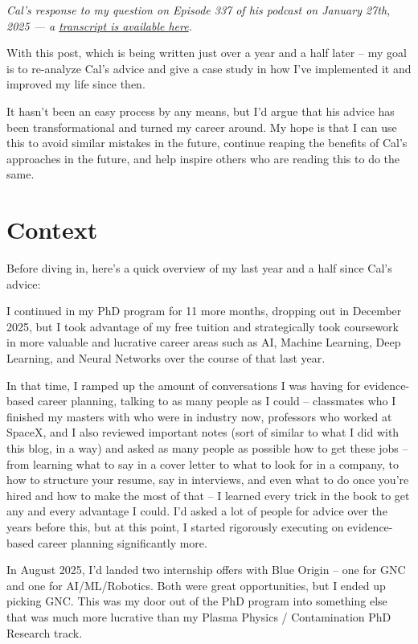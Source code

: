 \documentclass[11pt]{article}
\begin{document}
\noindent\footnotesize\textit{Cal's response to my question on Episode 337 of his podcast on January 27th, 2025 --- a \href{transcript-cal-newport-ep337.txt}{transcript is available here}.}\normalsize

\medskip

With this post, which is being written just over a year and a half later -- my goal is to re-analyze Cal's advice and give a case study in how I've implemented it and improved my life since then.

It hasn't been an easy process by any means, but I'd argue that his advice has been transformational and turned my career around. My hope is that I can use this to avoid similar mistakes in the future, continue reaping the benefits of Cal's approaches in the future, and help inspire others who are reading this to do the same.

\section*{Context}

Before diving in, here's a quick overview of my last year and a half since Cal's advice:

I continued in my PhD program for 11 more months, dropping out in December 2025, but I took advantage of my free tuition and strategically took coursework in more valuable and lucrative career areas such as AI, Machine Learning, Deep Learning, and Neural Networks over the course of that last year.

In that time, I ramped up the amount of conversations I was having for evidence-based career planning, talking to as many people as I could -- classmates who I finished my masters with who were in industry now, professors who worked at SpaceX, and I also reviewed important notes (sort of similar to what I did with this blog, in a way) and asked as many people as possible how to get these jobs -- from learning what to say in a cover letter to what to look for in a company, to how to structure your resume, say in interviews, and even what to do once you're hired and how to make the most of that -- I learned every trick in the book to get any and every advantage I could. I'd asked a lot of people for advice over the years before this, but at this point, I started rigorously executing on evidence-based career planning significantly more.

In August 2025, I'd landed two internship offers with Blue Origin -- one for GNC and one for AI/ML/Robotics. Both were great opportunities, but I ended up picking GNC. This was my door out of the PhD program into something else that was much more lucrative than my Plasma Physics / Contamination PhD Research track.
\end{document}
